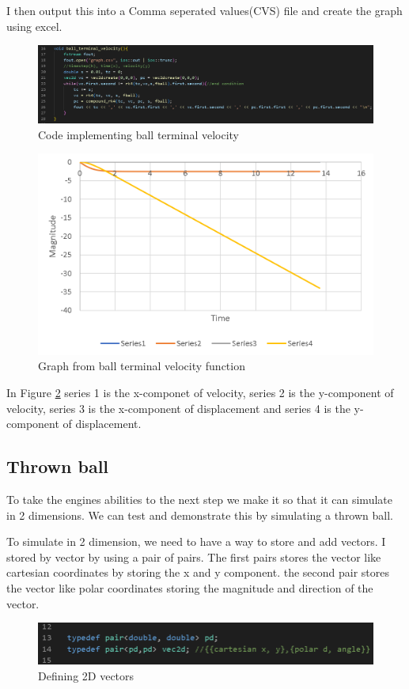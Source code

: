 \documentclass[12pt, a2paper]{article}
\begin{document}
I then output this into a Comma seperated values(CVS) file and create the graph using excel.
\begin{figure}[h]
\centering
\includegraphics[width=1\textwidth]{ball terminal velocity function}
\caption{Code implementing ball terminal velocity}
\label{fig 1}
\end{figure}
\begin{figure}[h]
\centering
\includegraphics[width=1\textwidth]{ball terminal velocity graph}
\caption{Graph from ball terminal velocity function}
\label{Graph 1}
\end{figure}

In Figure \ref{Graph 1} series 1 is the x-componet of velocity, series 2 is the y-component of velocity, series 3 is the x-component of displacement and series 4 is the y-component of displacement.
\pagebreak

\subsection{Thrown ball}
To take the engines abilities to the next step we make it so that it can simulate in 2 dimensions. We can test and demonstrate this by simulating a thrown ball.

To simulate in 2 dimension, we need to have a way to store and add vectors. I stored by vector by using a pair of pairs. The first pairs stores the vector like cartesian coordinates by storing the x and y component. the second pair stores the vector like polar coordinates storing the magnitude and direction of the vector.
\begin{figure}[h]
\center
\includegraphics[width = 1\textwidth]{vec2d definition}
\caption{Defining 2D vectors}
\label{fig 2}
\end{figure}
\pagebreak
\end{document}
